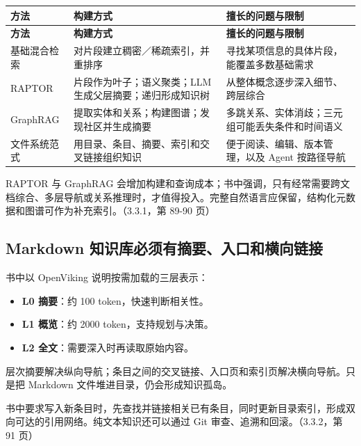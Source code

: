 \documentclass[UTF8,a4paper,11pt]{ctexart}
\newlength{\tableusable}
\begin{document}
\begingroup\small
\setlength{\tableusable}{\dimexpr\linewidth-4\tabcolsep\relax}
\begin{longtable}{@{}>{\raggedright\arraybackslash}p{0.2\tableusable}>{\raggedright\arraybackslash}p{0.36\tableusable}>{\raggedright\arraybackslash}p{0.44\tableusable}@{}}
\toprule
\textbf{方法} & \textbf{构建方式} & \textbf{擅长的问题与限制} \\
\midrule\endfirsthead
\toprule
\textbf{方法} & \textbf{构建方式} & \textbf{擅长的问题与限制} \\
\midrule\endhead
\bottomrule\endfoot
基础混合检索 & 对片段建立稠密／稀疏索引，并重排序 & 寻找某项信息的具体片段，能覆盖多数基础需求 \\
RAPTOR & 片段作为叶子；语义聚类；LLM 生成父层摘要；递归形成知识树 & 从整体概念逐步深入细节、跨层综合 \\
GraphRAG & 提取实体和关系；构建图谱；发现社区并生成摘要 & 多跳关系、实体消歧；三元组可能丢失条件和时间语义 \\
文件系统范式 & 用目录、条目、摘要、索引和交叉链接组织知识 & 便于阅读、编辑、版本管理，以及 Agent 按路径导航 \\
\end{longtable}\endgroup

RAPTOR 与 GraphRAG 会增加构建和查询成本；书中强调，只有经常需要跨文档综合、多层导航或关系推理时，才值得投入。完整自然语言应保留，结构化元数据和图谱可作为补充索引。（3.3.1，第 89-90 页）

\subsection{Markdown 知识库必须有摘要、入口和横向链接}

书中以 OpenViking 说明按需加载的三层表示：

\begin{itemize}
\item \textbf{L0 摘要}：约 100 token，快速判断相关性。
\item \textbf{L1 概览}：约 2000 token，支持规划与决策。
\item \textbf{L2 全文}：需要深入时再读取原始内容。
\end{itemize}

层次摘要解决纵向导航；条目之间的交叉链接、入口页和索引页解决横向导航。只是把 Markdown 文件堆进目录，仍会形成知识孤岛。

书中要求写入新条目时，先查找并链接相关已有条目，同时更新目录索引，形成双向可达的引用网络。纯文本知识还可以通过 Git 审查、追溯和回滚。（3.3.2，第 91 页）
\end{document}
